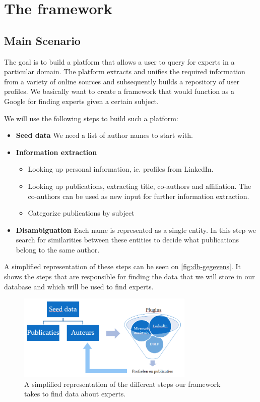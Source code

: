 \chapter{The framework}

\section{Main Scenario}

The goal is to build a platform that allows a user to query for experts in a particular domain. The
platform extracts and unifies the required information from a variety of online sources and
subsequently builds a repository of user profiles. We basically want to create a framework that would function as a Google for finding experts given a certain subject.

We will use the following steps to build such a platform:


\begin{itemize}
	\item \textbf{Seed data} We need a list of author names to start with.
	\item \textbf{Information extraction}
		\begin{itemize}
			\item Looking up personal information, ie. profiles from LinkedIn.
			\item Looking up publications, extracting title, co-authors and affiliation. The co-authors can be used as new input for further information extraction.
			\item Categorize publications by subject
		\end{itemize}
	\item \textbf{Disambiguation} Each name is represented as a single entity. In this step we search for similarities between these entities to decide what publications belong to the same author.
\end{itemize}

A simplified representation of these steps can be seen on \autoref{fig:db-gegevens}. It shows the steps that are responsible for finding the data that we will store in our database and which will be used to find experts.

\begin{figure}[htbp]
	\centering
		\includegraphics[width=0.75\textwidth]{fig/database-gegevens.png}
	\caption{A simplified representation of the different steps our framework takes to find data about experts.}
	\label{fig:db-gegevens}
\end{figure}

